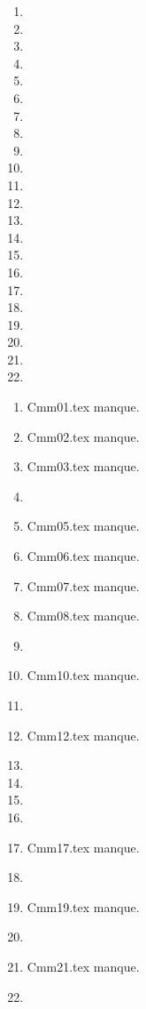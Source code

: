  
 
\begin{enumerate}
  \item  
  \item  
  \item  
  \item  
  \item  
  \item  
  \item  
  \item  
  \item  
  \item  
  \item  
  \item  
  \item  
  \item  
  \item  
  \item  
  \item  
  \item  
  \item  
  \item  
  \item  
  \item  
\end{enumerate} 
\clearpage 
{}
\begin{enumerate}
  \item Cmm01.tex manque. 
  \item Cmm02.tex manque. 
  \item Cmm03.tex manque. 
  \item  
  \item Cmm05.tex manque. 
  \item Cmm06.tex manque. 
  \item Cmm07.tex manque. 
  \item Cmm08.tex manque. 
  \item  
  \item Cmm10.tex manque. 
  \item  
  \item Cmm12.tex manque. 
  \item  
  \item  
  \item  
  \item  
  \item Cmm17.tex manque. 
  \item  
  \item Cmm19.tex manque. 
  \item  
  \item Cmm21.tex manque. 
  \item  
\end{enumerate} 
